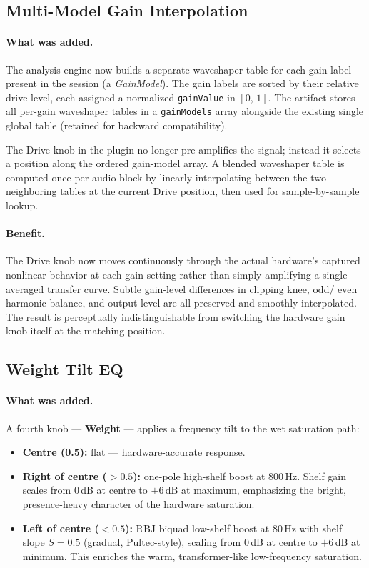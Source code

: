 \documentclass[11pt, letterpaper]{article}
\begin{document}
\subsection{Multi-Model Gain Interpolation}

\paragraph{What was added.}
The analysis engine now builds a separate waveshaper table for each gain label
present in the session (a \emph{GainModel}).  The gain labels are sorted by
their relative drive level, each assigned a normalized \texttt{gainValue} in
$[0,\,1]$.  The artifact stores all per-gain waveshaper tables in a
\texttt{gainModels} array alongside the existing single global table (retained
for backward compatibility).

The Drive knob in the plugin no longer pre-amplifies the signal; instead it
selects a position along the ordered gain-model array.  A blended waveshaper
table is computed once per audio block by linearly interpolating between the two
neighboring tables at the current Drive position, then used for sample-by-sample
lookup.

\paragraph{Benefit.}
The Drive knob now moves continuously through the actual hardware's captured
nonlinear behavior at each gain setting rather than simply amplifying a single
averaged transfer curve.  Subtle gain-level differences in clipping knee, odd/
even harmonic balance, and output level are all preserved and smoothly
interpolated.  The result is perceptually indistinguishable from switching the
hardware gain knob itself at the matching position.

\subsection{Weight Tilt EQ}

\paragraph{What was added.}
A fourth knob — \textbf{Weight} — applies a frequency tilt to the wet
saturation path:
\begin{itemize}[leftmargin=1.5em]
    \item \textbf{Centre (0.5):} flat — hardware-accurate response.
    \item \textbf{Right of centre ($>0.5$):} one-pole high-shelf boost at
          800\,Hz.  Shelf gain scales from 0\,dB at centre to $+6$\,dB at
          maximum, emphasizing the bright, presence-heavy character of the
          hardware saturation.
    \item \textbf{Left of centre ($<0.5$):} RBJ biquad low-shelf boost at
          80\,Hz with shelf slope $S = 0.5$ (gradual, Pultec-style), scaling
          from 0\,dB at centre to $+6$\,dB at minimum.  This enriches the
          warm, transformer-like low-frequency saturation.
\end{itemize}
\end{document}
